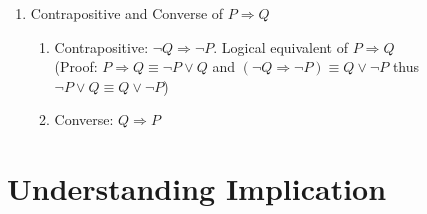 \documentclass[11pt]{article}
\begin{document}
\begin{enumerate}
\item Contrapositive and Converse of $P \Rightarrow Q$
\begin{enumerate}
\item Contrapositive: ${\neg Q} \Rightarrow {\neg P}$. Logical equivalent of $P \Rightarrow Q$\\
(Proof: $P \Rightarrow Q \equiv \neg P \vee Q$  and $(\neg Q \Rightarrow \neg P) \equiv Q \vee \neg P$ thus $\neg P \vee Q \equiv Q \vee \neg P$)
\item Converse: $Q \Rightarrow P$
\end{enumerate}
\end{enumerate}

\section*{Understanding Implication}
\end{document}
